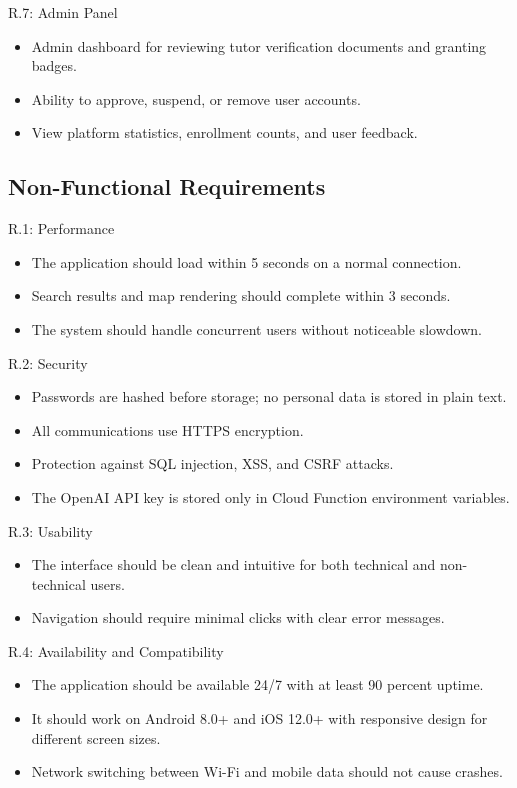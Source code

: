 \documentclass[12pt]{report}
\begin{document}
\noindent R.7: Admin Panel
\begin{itemize}
\item Admin dashboard for reviewing tutor verification documents and granting badges.
\item Ability to approve, suspend, or remove user accounts.
\item View platform statistics, enrollment counts, and user feedback.
\end{itemize}

\subsection{Non-Functional Requirements}

\noindent R.1: Performance
\begin{itemize}
\item The application should load within 5 seconds on a normal connection.
\item Search results and map rendering should complete within 3 seconds.
\item The system should handle concurrent users without noticeable slowdown.
\end{itemize}

\noindent R.2: Security
\begin{itemize}
\item Passwords are hashed before storage; no personal data is stored in plain text.
\item All communications use HTTPS encryption.
\item Protection against SQL injection, XSS, and CSRF attacks.
\item The OpenAI API key is stored only in Cloud Function environment variables.
\end{itemize}

\noindent R.3: Usability
\begin{itemize}
\item The interface should be clean and intuitive for both technical and non-technical users.
\item Navigation should require minimal clicks with clear error messages.
\end{itemize}

\noindent R.4: Availability and Compatibility
\begin{itemize}
\item The application should be available 24/7 with at least 90 percent uptime.
\item It should work on Android 8.0+ and iOS 12.0+ with responsive design for different screen sizes.
\item Network switching between Wi-Fi and mobile data should not cause crashes.
\end{itemize}
\end{document}
